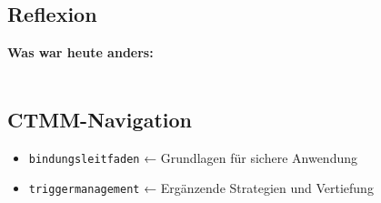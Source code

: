 \subsection*{\textcolor{ctmmPurple}{Reflexion}}
\textbf{Was war heute anders:}\\
\underline{\hspace{\textwidth}}\\
\underline{\hspace{\textwidth}}

\subsection*{\textcolor{ctmmBlue}{CTMM-Navigation}}
\begin{itemize}
  \item \texttt{bindungsleitfaden} ← Grundlagen für sichere Anwendung
  \item \texttt{triggermanagement} ← Ergänzende Strategien und Vertiefung
\end{itemize}